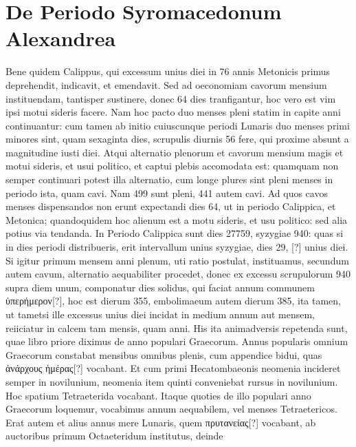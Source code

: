 \section{De Periodo Syromacedonum Alexandrea}
%
Bene quidem Calippus, qui excessum unius diei in 76 annis Metonicis
primus deprehendit, indicavit, et emendavit.
Sed ad oeconomiam
cavorum mensium instituendam, tantisper sustinere, donec 64
dies tranfigantur, hoc vero est vim ipsi motui sideris facere.
Nam hoc
pacto duo menses pleni statim in capite anni continuantur: cum tamen
ab initio cuiuscunque periodi Lunaris duo menses primi minores sint,
quam sexaginta dies, scrupulis diurnis 56 fere, qui proxime absunt a
magnitudine iusti diei.
%
Atqui alternatio plenorum et cavorum mensium
magis et motui sideris, et usui politico, et captui plebis accomodata
est: quamquam non semper continuari potest illa alternatio, cum
longe plures sint pleni menses in periodo ista, quam cavi.
Nam 499 sunt
pleni, 441 autem cavi.
Ad quos cavos menses dispensandos non erunt
expectandi dies 64, ut in periodo Calippica, et Metonica; quandoquidem
hoc alienum est a motu sideris, et usu politico: sed alia potius
via tendanda.
In Periodo Calippica sunt dies 27759, syzygiae 940:
quas si in dies periodi distribueris, erit intervallum unius syzygiae, dies
29, [?] unius diei.
Si igitur primum mensem anni plenum, uti ratio
postulat, instituamus, secundum autem cavum, alternatio aequabiliter
procedet, donec ex excessu scrupulorum 940 supra diem unum,
componatur dies solidus, qui faciat annum communem
 \textgreek{ὑπερήμερον[?]},
hoc est dierum 355, embolimaeum autem dierum 385, ita tamen, ut
tametsi ille excessus unius diei incidat in medium annum aut mensem,
reiiciatur in calcem tam mensis, quam anni.
 His ita animadversis
repetenda sunt, quae libro priore diximus de anno populari Graecorum.
Annus popularis omnium Graecorum constabat mensibus omnibus
plenis, cum appendice bidui, quas
 \textgreek{ἀνάρχους ἡμέρας[?]} vocabant.
Et cum
primi Hecatombaeonis neomenia incideret semper in novilunium,
neomenia item quinti conveniebat rursus in novilunium.
Hoc spatium Tetraeterida vocabant.
Itaque quoties de illo populari anno
Graecorum loquemur, vocabimus annum aequabilem, vel menses
Tetraetericos.
Erat autem et alius annus mere Lunaris, quem
 \textgreek{πρυτανείας[?]}
vocabant, ab auctoribus primum Octaeteridum institutus, deinde
